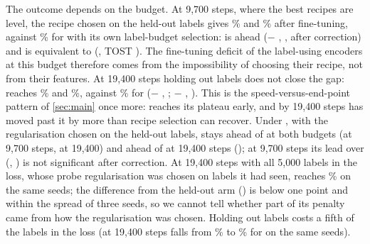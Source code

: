 The outcome depends on the budget. At 9,700 steps, where the best recipes are level, the recipe chosen on the held-out
labels gives \supcon {}\% and \union {}\% after fine-tuning,
against \% for \simclr with its own label-budget selection: \supcon is ahead (\simclr $-$
\supcon {}\pt, ,
 after correction) and \union is equivalent to \simclr
(\pt, TOST ). The fine-tuning deficit
of the label-using encoders at this budget therefore comes from the impossibility of choosing their recipe, not
from their features. At 19,400 steps holding out labels does not close the gap: \supcon reaches
\% and \union {}\%, against \% for
\simclr (\simclr $-$ \supcon {}\pt, ; \simclr $-$ \union
{}\pt, ). This is the speed-versus-end-point pattern of
\cref{sec:main} once more: \supcon reaches its plateau early, and by 19,400 steps \simclr has moved past it by more than
recipe selection can recover. Under \lpfive, with the regularisation chosen on the held-out labels, \simclr stays ahead of
\supcon at both budgets (\pt at 9,700 steps,
\pt at 19,400) and ahead of \union at 19,400 steps
(\pt); at 9,700 steps its lead over \union
(\pt, ) is not significant after
correction. At 19,400 steps
\union with all 5,000 labels in the loss, whose probe regularisation was chosen on labels it had seen, reaches
\% on the same seeds; the difference from the held-out arm (\pt) is below
one point and within the spread of three seeds, so we cannot tell whether part of its \lpfive penalty came from how
the regularisation was chosen. Holding out labels costs a fifth of the labels in the loss (at 19,400 steps \lpall falls
from \% to \% for \supcon on the same seeds).

